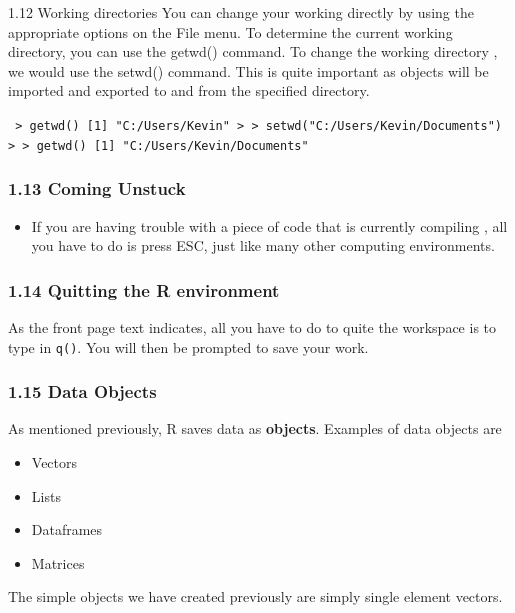 \documentclass{beamer}
\begin{document}
 
 \begin{frame}
 	1.12 Working directories
 	You can change your working directly by using the appropriate options on the File menu. To
 	determine the current working directory, you can use the getwd() command. To change the
 	working directory , we would use the setwd() command. This is quite important as objects
 	will be imported and exported to and from the specified directory.
 \end{frame}
 \begin{frame}
 	\texttt{	> getwd()
 		[1] "C:/Users/Kevin"
 		>
 		> setwd("C:/Users/Kevin/Documents")
 		>
 		> getwd()
 		[1] "C:/Users/Kevin/Documents"}
 \end{frame}
 \begin{frame}
 	\frametitle{1.13 Coming Unstuck}
 	\Large
 	\begin{itemize}
 		\item  If you are having trouble with a piece of code that is currently compiling , all you have to do is press ESC, just like many other computing environments.
 	\end{itemize}  
 \end{frame}
 \begin{frame}
 	\frametitle{1.14 Quitting the R environment}
 	As the front page text indicates, all you have to do to quite the workspace is to type in \texttt{q()}.
 	You will then be prompted to save your work.
 \end{frame}
 \begin{frame}
 	\frametitle{1.15 Data Objects}
 	As mentioned previously, R saves data as \textbf{objects}. Examples of data objects are
 	\begin{itemize}
 		\item Vectors
 		\item Lists
 		\item Dataframes
 		\item Matrices
 	\end{itemize}
 	The simple objects we have created previously are simply single element vectors.
 \end{frame}
\end{document}
